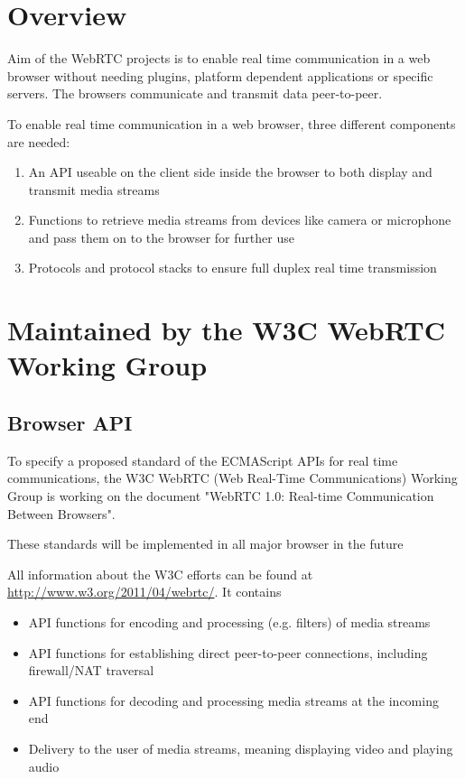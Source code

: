 \label{chap:webrtc-documents}

\section{Overview}
Aim of the WebRTC projects is to enable real time communication in a web browser without needing plugins, platform dependent applications or specific servers.
The browsers communicate and transmit data peer-to-peer.

To enable real time communication in a web browser, three different components are needed:
\begin{enumerate}
\item An API useable on the client side inside the browser to both display and transmit media streams
\item Functions to retrieve media streams from devices like camera or microphone and pass them on to the browser for further use
\item Protocols and protocol stacks to ensure full duplex real time transmission
\end{enumerate}

\section{Maintained by the W3C WebRTC Working Group}
\subsection{Browser API}
To specify a proposed standard of the ECMAScript APIs for real time communications, the W3C WebRTC (Web Real-Time Communications) Working Group is working on the document "WebRTC 1.0: Real-time Communication Between Browsers".

These standards will be implemented in all major browser in the future

All information about the W3C efforts can be found at \url{http://www.w3.org/2011/04/webrtc/}.
It contains
\begin{itemize}
\item API functions for encoding and processing (e.g. filters) of media streams
\item API functions for establishing direct peer-to-peer connections, including firewall/NAT traversal
\item API functions for decoding and processing media streams at the incoming end
\item Delivery to the user of media streams, meaning displaying video and playing audio
\end{itemize}

